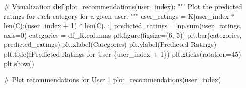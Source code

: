 \documentclass[
  letterpaper,
  DIV=11,
  numbers=noendperiod]{scrreprt}
\newenvironment{Shaded}{\begin{snugshade}}{\end{snugshade}}
\newcommand{\BuiltInTok}[1]{\textcolor[rgb]{0.00,0.23,0.31}{#1}}
\newcommand{\CommentTok}[1]{\textcolor[rgb]{0.37,0.37,0.37}{#1}}
\newcommand{\DecValTok}[1]{\textcolor[rgb]{0.68,0.00,0.00}{#1}}
\newcommand{\KeywordTok}[1]{\textcolor[rgb]{0.00,0.23,0.31}{\textbf{#1}}}
\newcommand{\NormalTok}[1]{\textcolor[rgb]{0.00,0.23,0.31}{#1}}
\newcommand{\OperatorTok}[1]{\textcolor[rgb]{0.37,0.37,0.37}{#1}}
\newcommand{\SpecialCharTok}[1]{\textcolor[rgb]{0.37,0.37,0.37}{#1}}
\newcommand{\SpecialStringTok}[1]{\textcolor[rgb]{0.13,0.47,0.30}{#1}}
\newcommand{\StringTok}[1]{\textcolor[rgb]{0.13,0.47,0.30}{#1}}
\theoremstyle{plain}
\theoremstyle{definition}
\theoremstyle{remark}
\begin{document}
\begin{Shaded}
\begin{Highlighting}[]
\CommentTok{\# Visualization}
\KeywordTok{def}\NormalTok{ plot\_recommendations(user\_index):}
    \CommentTok{""" Plot the predicted ratings for each category for a given user. """}
\NormalTok{    user\_ratings }\OperatorTok{=}\NormalTok{ K[user\_index }\OperatorTok{*} \BuiltInTok{len}\NormalTok{(C):(user\_index }\OperatorTok{+} \DecValTok{1}\NormalTok{) }\OperatorTok{*} \BuiltInTok{len}\NormalTok{(C), :]}
\NormalTok{    predicted\_ratings }\OperatorTok{=}\NormalTok{ np.}\BuiltInTok{sum}\NormalTok{(user\_ratings, axis}\OperatorTok{=}\DecValTok{0}\NormalTok{)}
\NormalTok{    categories }\OperatorTok{=}\NormalTok{ df\_K.columns}
\NormalTok{    plt.figure(figsize}\OperatorTok{=}\NormalTok{(}\DecValTok{6}\NormalTok{, }\DecValTok{5}\NormalTok{))}
\NormalTok{    plt.bar(categories, predicted\_ratings)}
\NormalTok{    plt.xlabel(}\StringTok{\textquotesingle{}Categories\textquotesingle{}}\NormalTok{)}
\NormalTok{    plt.ylabel(}\StringTok{\textquotesingle{}Predicted Ratings\textquotesingle{}}\NormalTok{)}
\NormalTok{    plt.title(}\SpecialStringTok{f\textquotesingle{}Predicted Ratings for User }\SpecialCharTok{\{}\NormalTok{user\_index }\OperatorTok{+} \DecValTok{1}\SpecialCharTok{\}}\SpecialStringTok{\textquotesingle{}}\NormalTok{)}
\NormalTok{    plt.xticks(rotation}\OperatorTok{=}\DecValTok{45}\NormalTok{)}
\NormalTok{    plt.show()}

\CommentTok{\# Plot recommendations for User 1}
\NormalTok{plot\_recommendations(user\_index)}
\end{Highlighting}
\end{Shaded}
\end{document}

